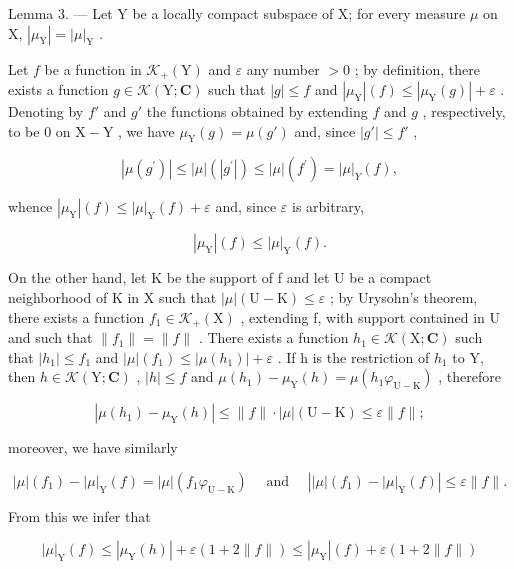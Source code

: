 Lemma 3. --- Let Y be a locally compact subspace of X; for every measure \(\mu\) on X, \(|\mu_{\mathrm{Y}}| = |\mu|_{\mathrm{Y}}\) .

Let \(f\) be a function in \(\mathcal{K}_{+}(\mathrm{Y})\) and \(\varepsilon\) any number \(>0\) ; by definition, there exists a function \(g \in \mathcal{K}(\mathrm{Y};\mathbf{C})\) such that \(|g| \leqslant f\) and \(|\mu_{\mathrm{Y}}|(f) \leqslant |\mu_{\mathrm{Y}}(g)| + \varepsilon\) . Denoting by \(f'\) and \(g'\) the functions obtained by extending \(f\) and \(g\) , respectively, to be 0 on \(\mathrm{X} - \mathrm{Y}\) , we have \(\mu_{\mathrm{Y}}(g) = \mu(g')\) and, since \(|g'| \leqslant f'\) ,

\[
\left| \mu \left(g ^ {\prime}\right) \right| \leqslant | \mu | \left(\left| g ^ {\prime} \right|\right) \leqslant | \mu | \left(f ^ {\prime}\right) = | \mu | _ {Y} (f),
\]

whence \(|\mu_{\mathrm{Y}}|(f)\leqslant |\mu |_{\mathrm{Y}}(f) + \varepsilon\) and, since \(\varepsilon\) is arbitrary,

\[
| \mu_ {\mathrm{Y}} | (f) \leqslant | \mu | _ {\mathrm{Y}} (f).
\]

On the other hand, let K be the support of f and let U be a compact neighborhood of K in X such that \(|\mu|(\mathrm{U}-\mathrm{K}) \leqslant \varepsilon\) ; by Urysohn's theorem, there exists a function \(f_{1} \in \mathcal{K}_{+}(\mathrm{X})\) , extending f, with support contained in U and such that \(\|f_{1}\| = \|f\|\) . There exists a function \(h_{1} \in \mathcal{K}(\mathrm{X}; \mathbf{C})\) such that \(|h_{1}| \leqslant f_{1}\) and \(|\mu|(f_{1}) \leqslant |\mu(h_{1})| + \varepsilon\) . If h is the restriction of \(h_{1}\) to Y, then \(h \in \mathcal{K}(\mathrm{Y}; \mathbf{C})\) , \(|h| \leqslant f\) and \(\mu(h_{1}) - \mu_{\mathrm{Y}}(h) = \mu(h_{1}\varphi_{\mathrm{U}-\mathrm{K}})\) , therefore

\[
\left| \mu \left(h _ {1}\right) - \mu_ {\mathrm{Y}} (h) \right| \leqslant \| f \| \cdot | \mu | (\mathrm{U} - \mathrm{K}) \leqslant \varepsilon \| f \|;
\]

moreover, we have similarly

\[
| \mu | (f _ {1}) - | \mu | _ {\mathrm{Y}} (f) = | \mu | (f _ {1} \varphi_ {\mathrm{U} - \mathrm{K}}) \quad \text { and } \quad \left| | \mu | (f _ {1}) - | \mu | _ {\mathrm{Y}} (f) \right| \leqslant \varepsilon \| f \|.
\]

From this we infer that

\[
| \mu | _ {\mathrm{Y}} (f) \leqslant | \mu_ {\mathrm{Y}} (h) | + \varepsilon (1 + 2 \| f \|) \leqslant | \mu_ {\mathrm{Y}} | (f) + \varepsilon (1 + 2 \| f \|)
\]

